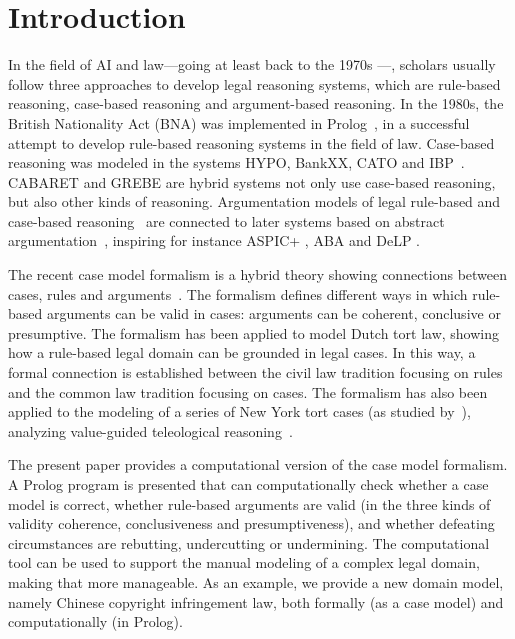 \documentclass{IOS-Book-Article}
\begin{document}
\section{Introduction}
\noindent 
In the field of AI and law---going at least back to the 1970s \cite{Buchanan1970Some}---, scholars usually follow three approaches to develop legal reasoning systems, which are rule-based reasoning, case-based reasoning and argument-based reasoning. In the 1980s, the British Nationality Act (BNA) was implemented in Prolog~\citep{Sergot1986The}, in a successful attempt to develop rule-based reasoning systems in the field of law. Case-based reasoning was modeled in the systems HYPO, BankXX, CATO and IBP~\citep{risslandAshley1987,Ashley1991Reasoning,Rissland1996BankXX,Aleven1997Evaluating,Bruninghaus2003Predicting}. 
CABARET \citep{Rissland1991CABARET} and GREBE \citep{Branting1991Building} are hybrid systems not only use case-based reasoning, but also other kinds of reasoning. 
Argumentation models of legal rule-based and case-based reasoning~\citep{prakkenSartor1996,prakkenSartor1998} are connected to later systems based on abstract argumentation~\citep{Dung1995On}, inspiring for instance ASPIC+ \citep{Prakken2010An}, ABA \citep{Bondarenko1997An} and DeLP \citep{Garcia2003Defeasible}.

The recent case model formalism \citep{Verheij2016Correct} is a hybrid theory showing connections between cases, rules and arguments~\citep{Verheij2017Formalizing}. The formalism defines different ways in which rule-based arguments can be valid in cases: arguments can be coherent, conclusive or presumptive. The formalism has been applied to model Dutch tort law, showing how a rule-based legal domain can be grounded in legal cases. In this way, a formal connection is established between the civil law tradition focusing on rules and the common law tradition focusing on cases. The formalism has also been applied to the modeling of a series of New York tort cases (as studied by~\cite{bermanHafner1995,hafnerBerman2002}), analyzing value-guided teleological reasoning~\citep{Verheij2016Formalizing}.

The present paper provides a computational version of the case model formalism. A Prolog program is presented that can computationally check whether a case model is correct, whether rule-based arguments are valid (in the three kinds of validity coherence, conclusiveness and presumptiveness), and whether defeating circumstances are rebutting, undercutting or undermining. The computational tool can be used to support the manual modeling of a complex legal domain, making that more manageable. As an example, we provide a new domain model, namely Chinese copyright infringement law, both formally (as a case model) and computationally (in Prolog).
\end{document}
